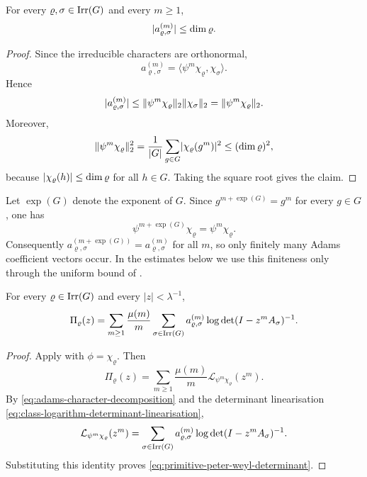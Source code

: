 \begin{lemma}\label{lem:adams-coefficients-bounded}
  For every \(\varrho,\sigma\in\operatorname{Irr}(G)\) and every \(m\ge 1\),
  \[
    \lvert a_{\varrho,\sigma}^{(m)} \rvert\le \dim\varrho.
  \]
\end{lemma}

\begin{proof}
  Since the irreducible characters are orthonormal,
  \[
    a_{\varrho,\sigma}^{(m)}
    =\langle \psi^m\chi_\varrho,\chi_\sigma\rangle.
  \]
  Hence
  \[
    \lvert a_{\varrho,\sigma}^{(m)} \rvert
    \le \lVert \psi^m\chi_\varrho \rVert_2\lVert \chi_\sigma \rVert_2
    =\lVert \psi^m\chi_\varrho \rVert_2.
  \]
  Moreover,
  \[
    \lVert \psi^m\chi_\varrho \rVert_2^2
    =\frac{1}{|G|}\sum_{g\in G}\lvert \chi_\varrho(g^m) \rvert^2
    \le (\dim\varrho)^2,
  \]
  because \(\lvert \chi_\varrho(h) \rvert\le \dim\varrho\) for all \(h\in G\).
  Taking the square root gives the claim.
\end{proof}

\begin{remark}
  \label{rem:adams-coefficients-periodic}
  Let \(\exp(G)\) denote the exponent of \(G\). Since
  \(g^{m+\exp(G)}=g^m\) for every \(g\in G\), one has
  \[
    \psi^{m+\exp(G)}\chi_\varrho=\psi^m\chi_\varrho.
  \]
  Consequently
  \(a_{\varrho,\sigma}^{(m+\exp(G))}=a_{\varrho,\sigma}^{(m)}\) for all
  \(m\), so only finitely many Adams coefficient vectors occur. In the
  estimates below we use this finiteness only through the uniform bound
  of .
\end{remark}

\begin{corollary}
  \label{cor:primitive-peter-weyl-determinant}
  For every \(\varrho\in\operatorname{Irr}(G)\) and every \(|z|<\lambda^{-1}\),
  \begin{equation}\label{eq:primitive-peter-weyl-determinant}
    \Pi_\varrho(z)
    =
    \sum_{m\ge 1}\frac{\mu(m)}{m}
      \sum_{\sigma\in\operatorname{Irr}(G)}
        a_{\varrho,\sigma}^{(m)}
        \log\det(I-z^mA_\sigma)^{-1}.
  \end{equation}
\end{corollary}

\begin{proof}
  Apply  with
  \(\phi=\chi_\varrho\). Then
  \[
    \Pi_\varrho(z)
    =
    \sum_{m\ge 1}\frac{\mu(m)}{m}
      \mathcal L_{\psi^m\chi_\varrho}(z^m).
  \]
  By \eqref{eq:adams-character-decomposition} and the determinant
  linearisation \eqref{eq:class-logarithm-determinant-linearisation},
  \[
    \mathcal L_{\psi^m\chi_\varrho}(z^m)
    =
    \sum_{\sigma\in\operatorname{Irr}(G)}
      a_{\varrho,\sigma}^{(m)}
      \log\det(I-z^mA_\sigma)^{-1}.
  \]
  Substituting this identity proves
  \eqref{eq:primitive-peter-weyl-determinant}.
\end{proof}

